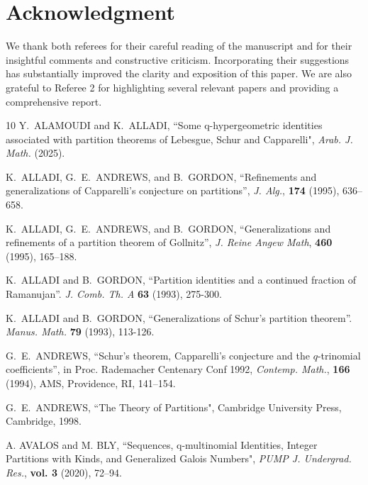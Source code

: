 \documentclass[12pt,a4paper]{amsart}
\theoremstyle{definition}
\theoremstyle{notation}
\theoremstyle{corollary}
\begin{document}
\section*{Acknowledgment}
We thank both referees for their careful reading of the manuscript and for their insightful comments and constructive criticism. Incorporating their suggestions has substantially improved the clarity and exposition of this paper. We are also grateful to Referee 2 for highlighting several relevant papers and providing a comprehensive report.


\begin{thebibliography}{10}
Y.~ALAMOUDI and K.~ALLADI, ``Some q-hypergeometric identities associated with partition theorems of Lebesgue, Schur and Capparelli", \textit{Arab. J. Math.} (2025).

K.~ALLADI, G.~E.~ANDREWS, and B.~GORDON, ``Refinements and generalizations of Capparelli's conjecture on partitions'', \textit{ J. Alg.}, \textbf{174} (1995), 636--658.

K.~ALLADI, G.~E.~ANDREWS, and B.~GORDON, ``Generalizations and refinements of a partition
theorem of Gollnitz'', \textit{J. Reine Angew Math}, \textbf{460} (1995), 165--188.

K.~ALLADI and B.~GORDON, ``Partition identities and a continued fraction of Ramanujan''. \textit{J. Comb. Th. A} \textbf{63} (1993), 275-300. 

K.~ALLADI and B.~GORDON, ``Generalizations of Schur's partition theorem''. \textit{Manus. Math.} \textbf{79} (1993), 113-126. 

G.~E.~ANDREWS, ``Schur's theorem, Capparelli's conjecture and the $q$-trinomial coefficients'', in Proc. Rademacher Centenary Conf 1992, \textit{Contemp. Math.}, \textbf{166} (1994), AMS, Providence, RI, 141--154.

G.~E.~ANDREWS, ``The Theory of Partitions", Cambridge University Press, Cambridge, 1998.

A. AVALOS and M. BLY, ``Sequences, q-multinomial Identities, Integer Partitions with Kinds, and Generalized Galois Numbers", \textit{PUMP J. Undergrad. Res.}, \textbf{vol. 3} (2020), 72--94.


\end{thebibliography}
\end{document}

